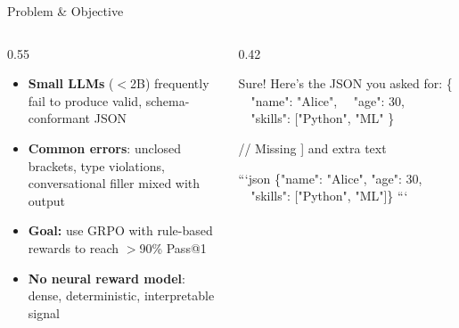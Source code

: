 \documentclass[10pt, aspectratio=169]{beamer}
\begin{document}
\begin{frame}{Problem \& Objective}
  \begin{columns}[T]
    \begin{column}{0.55\textwidth}
      \begin{itemize}
        \setlength\itemsep{0.7em}
        \item[\textcolor{sky}{\faAngleRight}] \textbf{Small LLMs} ($<$2B) frequently fail to produce
              valid, schema-conformant JSON
        \item[\textcolor{sky}{\faAngleRight}] \textbf{Common errors}: unclosed brackets, type violations,
              conversational filler mixed with output
        \item[\textcolor{sky}{\faAngleRight}] \textbf{Goal:} use GRPO with rule-based rewards
              to reach $>$90\% Pass@1
        \item[\textcolor{sky}{\faAngleRight}] \textbf{No neural reward model}:
              dense, \alert{deterministic}, interpretable signal
      \end{itemize}
    \end{column}
    \begin{column}{0.42\textwidth}
      \begin{tcolorbox}[codebox, title={\color{warn}\faTimesCircle~Typical failure}, fonttitle=\scriptsize\bfseries, coltitle=warn]
Sure! Here's the JSON you asked for:
\{
~~"name": "Alice",
~~"age": 30,
~~"skills": ["Python", "ML"
\}

\textcolor{warn}{// Missing ] and extra text}
      \end{tcolorbox}
      \vspace{0.4em}
      \begin{tcolorbox}[codebox, title={\color{accent}\faCheckCircle~Expected output}, fonttitle=\scriptsize\bfseries, coltitle=accent]
```json
\{"name": "Alice", "age": 30,
~~"skills": ["Python", "ML"]\}
```
      \end{tcolorbox}
    \end{column}
  \end{columns}
\end{frame}
\end{document}
